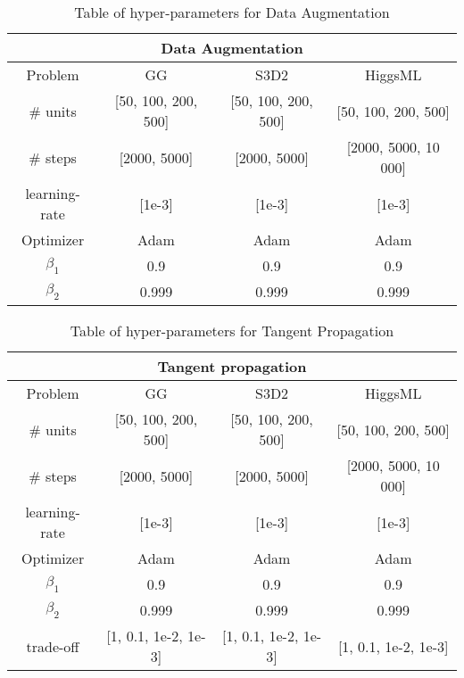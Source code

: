 \begin{table}[ht!]
\centering
\begin{tabular}{||c c c c||} 
 \hline
 \multicolumn{4}{|c|}{Data Augmentation}\\
 \hline
 Problem & GG & S3D2 & HiggsML \\ [0.5ex] 
 \hline
 \# units & [50, 100, 200, 500] & [50, 100, 200, 500] & [50, 100, 200, 500] \\ 
 \# steps & [2000, 5000] & [2000, 5000] & [2000, 5000, 10 000] \\
 learning-rate & [1e-3] & [1e-3] & [1e-3] \\
 Optimizer & Adam & Adam & Adam \\
 $\beta_1$ & 0.9 & 0.9 & 0.9 \\
 $\beta_2$ & 0.999 & 0.999 & 0.999 \\
 \hline
\end{tabular}
\caption{Table of hyper-parameters for Data Augmentation}
\label{table:HP_DA}
\end{table}


\begin{table}[ht!]
\centering
\begin{tabular}{||c c c c||} 
 \hline
 \multicolumn{4}{|c|}{Tangent propagation}\\
 \hline
 Problem & GG & S3D2 & HiggsML \\ [0.5ex] 
 \hline
 \# units & [50, 100, 200, 500] & [50, 100, 200, 500] & [50, 100, 200, 500] \\ 
 \# steps & [2000, 5000] & [2000, 5000] & [2000, 5000, 10 000] \\
 learning-rate & [1e-3] & [1e-3] & [1e-3] \\
 Optimizer & Adam & Adam & Adam \\
 $\beta_1$ & 0.9 & 0.9 & 0.9 \\
 $\beta_2$ & 0.999 & 0.999 & 0.999 \\
 trade-off & [1, 0.1, 1e-2, 1e-3] & [1, 0.1, 1e-2, 1e-3] & [1, 0.1, 1e-2, 1e-3] \\
 \hline
\end{tabular}
\caption{Table of hyper-parameters for Tangent Propagation}
\label{table:HP_TP}
\end{table}



